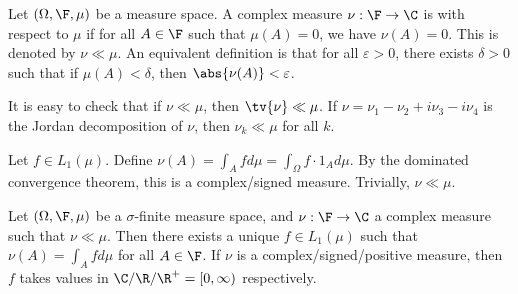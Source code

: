 \documentclass[a4paper]{article}
\begin{document}
Let $(\Omega,\F,\mu)$ be a measure space. A complex measure $\nu:\F\to\C$ is  with respect to $\mu$ if for all $A\in\F$ such that $\mu(A)=0$, we have $\nu(A)=0$. This is denoted by $\nu\ll\mu$. An equivalent definition is that for all $\varepsilon>0$, there exists $\delta>0$ such that if $\mu(A)<\delta$, then $\abs{\nu(A)}<\varepsilon$.

\begin{remark}
  It is easy to check that if $\nu\ll\mu$, then $\tv{\nu}\ll\mu$. If $\nu=\nu_1-\nu_2+i\nu_3-i\nu_4$ is the Jordan decomposition of $\nu$, then $\nu_k\ll\mu$ for all $k$.
\end{remark}

\begin{eg}
  Let $f\in L_1(\mu)$. Define $\nu(A)=\int_A f d\mu=\int_\Omega f\cdot 1_A d\mu$. By the dominated convergence theorem, this is a complex/signed measure. Trivially, $\nu\ll\mu$.
\end{eg}

\begin{nthm}\label{thm:RadonNikodym}
  Let $(\Omega,\F,\mu)$ be a $\sigma$-finite measure space, and $\nu:\F\to\C$ a complex measure such that $\nu\ll\mu$. Then there exists a unique $f\in L_1(\mu)$ such that $\nu(A)=\int_A f d\mu$ for all $A\in\F$. If $\nu$ is a complex/signed/positive measure, then $f$ takes values in $\C/\R/\R^+=[0,\infty)$ respectively.
\end{nthm}
\end{document}
